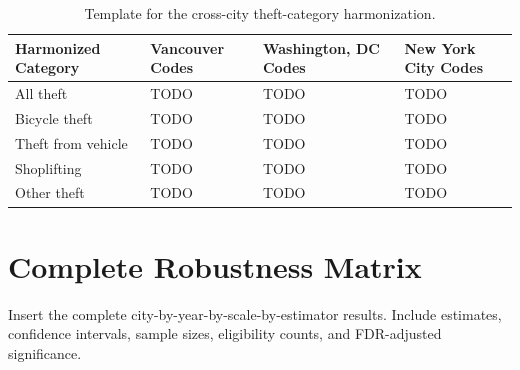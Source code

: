 \documentclass[applsci,article,submit,moreauthors]{Definitions/mdpi}
\begin{document}
\begin{table}[H]
\caption{Template for the cross-city theft-category harmonization.}
\label{tab:offense_crosswalk}
\begin{tabularx}{\textwidth}{lXXX}
\toprule
\textbf{Harmonized Category} & \textbf{Vancouver Codes} & \textbf{Washington, DC Codes} & \textbf{New York City Codes}\\
\midrule
All theft & TODO & TODO & TODO\\
Bicycle theft & TODO & TODO & TODO\\
Theft from vehicle & TODO & TODO & TODO\\
Shoplifting & TODO & TODO & TODO\\
Other theft & TODO & TODO & TODO\\
\bottomrule
\end{tabularx}
\end{table}

\section{Complete Robustness Matrix}
\label{app:robustness}

Insert the complete city-by-year-by-scale-by-estimator results. Include estimates, confidence intervals, sample sizes, eligibility counts, and FDR-adjusted significance.

\fi
\end{document}
